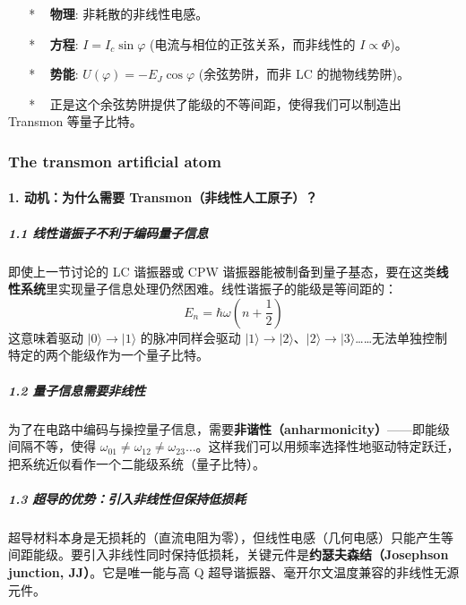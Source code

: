 \documentclass[12pt,a4paper,oneside]{ctexbook}
\let\oldparagraph\paragraph
\renewcommand{\paragraph}[1]{\oldparagraph{#1}\mbox{}}
\let\oldsubparagraph\subparagraph
\renewcommand{\subparagraph}[1]{\oldsubparagraph{#1}\mbox{}}
\begin{document}
~ ~ * ~ \textbf{物理}: 非耗散的非线性电感。

~ ~ * ~ \textbf{方程}: \(I = I_c \sin \varphi\)
(电流与相位的正弦关系，而非线性的 \(I \propto \Phi\))。

~ ~ * ~ \textbf{势能}: \(U(\varphi) = -E_J \cos \varphi\)
(余弦势阱，而非 LC 的抛物线势阱)。

~ ~ * ~ 正是这个余弦势阱提供了能级的不等间距，使得我们可以制造出
Transmon 等量子比特。

\subsubsection{The transmon artificial
atom}\label{c.-the-transmon-artificial-atom}


\paragraph{1. 动机：为什么需要
Transmon（非线性人工原子）？}\label{ux52a8ux673aux4e3aux4ec0ux4e48ux9700ux8981-transmonux975eux7ebfux6027ux4ebaux5de5ux539fux5b50}

\subparagraph{1.1
线性谐振子不利于编码量子信息}\label{ux7ebfux6027ux8c10ux632fux5b50ux4e0dux5229ux4e8eux7f16ux7801ux91cfux5b50ux4fe1ux606f}

即使上一节讨论的 LC 谐振器或 CPW
谐振器能被制备到量子基态，要在这类\textbf{线性系统}里实现量子信息处理仍然困难。线性谐振子的能级是等间距的：
\[E_n = \hbar\omega\left(n+\frac{1}{2}\right)\] 这意味着驱动
\(|0\rangle \rightarrow |1\rangle\) 的脉冲同样会驱动
\(|1\rangle \rightarrow |2\rangle\)、\(|2\rangle \rightarrow |3\rangle\)\ldots{}\ldots{}无法单独控制特定的两个能级作为一个量子比特。

\subparagraph{1.2
量子信息需要非线性}\label{ux91cfux5b50ux4fe1ux606fux9700ux8981ux975eux7ebfux6027}

为了在电路中编码与操控量子信息，需要\textbf{非谐性（anharmonicity）}------即能级间隔不等，使得
\(\omega_{01} \neq \omega_{12} \neq \omega_{23} \dots\)。这样我们可以用频率选择性地驱动特定跃迁，把系统近似看作一个二能级系统（量子比特）。

\subparagraph{1.3
超导的优势：引入非线性但保持低损耗}\label{ux8d85ux5bfcux7684ux4f18ux52bfux5f15ux5165ux975eux7ebfux6027ux4f46ux4fddux6301ux4f4eux635fux8017}

超导材料本身是无损耗的（直流电阻为零），但线性电感（几何电感）只能产生等间距能级。要引入非线性同时保持低损耗，关键元件是\textbf{约瑟夫森结（Josephson
junction, JJ）}。它是唯一能与高 Q
超导谐振器、毫开尔文温度兼容的非线性无源元件。
\end{document}
